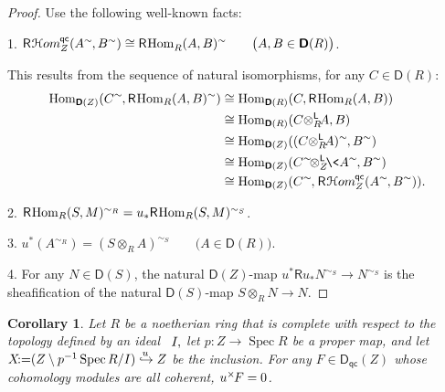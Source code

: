 \documentclass{compositio}
\theoremstyle{plain}
\newtheorem{subcor}[equation]{Corollary}
\theoremstyle{definition}
\theoremstyle{remark}
\numberwithin{equation}{thm}
\begin{document}
\begin{proof} Use the following well-known facts:{\vspace{2pt}}

1. ${{\mathsf R}{\mkern1mu}{{\mathcal H} om}_{{Z}}^{{\mkern-1mu}{\mathsf{qc}}}}(A^\sim{\mkern-1mu},B^\sim)\cong{\mathsf R}{\mkern-1mu}{\mkern-1mu}\operatorname{Hom}^{}_R(A,B)^\sim\qquad\big(A,B\in{\boldsymbol{\mathsf{D}}}(R)\big)$.{\vspace{2pt}}

\begin{small}
This results from the sequence of natural isomorphisms, for any $C\in{\boldsymbol{\mathsf{D}}}(R)$:
\begin{align*}
\operatorname{Hom}_{{\boldsymbol{\mathsf{D}}}(Z)}(C^\sim{\mkern-1mu},{\mathsf R}{\mkern-1mu}{\mkern-1mu}\operatorname{Hom}_R(A,B)^\sim)&\cong \operatorname{Hom}_{{\boldsymbol{\mathsf{D}}}(R)}(C,{\mathsf R}{\mkern-1mu}{\mkern-1mu}\operatorname{Hom}_R(A,B))\\
&\cong \operatorname{Hom}_{{\boldsymbol{\mathsf{D}}}(R)}(C{\otimes^{\mathsf L}_{{R}}}\!A,B)\\
&\cong \operatorname{Hom}_{{\boldsymbol{\mathsf{D}}}(Z)}((C{\otimes^{\mathsf L}_{{R}}}\!A)^\sim{\mkern-1mu},B^\sim)\\
&\cong \operatorname{Hom}_{{\boldsymbol{\mathsf{D}}}(Z)}(C^\sim\!{\otimes^{\mathsf L}_{{Z}}}\!\<A^\sim{\mkern-1mu},B^\sim)\\
&\cong \operatorname{Hom}_{{\boldsymbol{\mathsf{D}}}(Z)}(C^\sim{\mkern-1mu},{\mkern1mu}{{\mathsf R}{\mkern1mu}{{\mathcal H} om}_{{Z}}^{{\mkern-1mu}{\mathsf{qc}}}}(A^\sim{\mkern-1mu},B^\sim)).
\end{align*}
\end{small}
\vskip-8pt
2. ${\mathsf R}{\mkern-1mu}{\mkern-1mu}\operatorname{Hom}_R(S,M)^{\sim_R}= u_*{\mathsf R}{\mkern-1mu}{\mkern-1mu}\operatorname{Hom}_R(S,M)^{\sim_S}$.{\vspace{1pt}}

3. $u^*(A^{\sim_R})=(S\otimes_R A)^{\sim_S}\qquad\big(A\in{\boldsymbol{\mathsf{D}}}(R)\big).${\vspace{1pt}}

4. For any $N\in{\boldsymbol{\mathsf{D}}}(S)$, the natural ${\boldsymbol{\mathsf{D}}}(Z)$-map $u^*{\mathsf R} u_*N^{\sim_S}\to N^{\sim_S}$ is the sheafification of the natural ${\boldsymbol{\mathsf{D}}}(S)$-map $S\otimes_R N\to N$.
\end{proof}

\begin{subcor}\label{varGM}
 Let\/ $R$ be a  noetherian ring that is complete with respect to the topology defined by an ideal~ $I{\mkern-1mu},$ let\/ $p\colon Z\to \operatorname{Spec} R$ be a  proper map,
and let\/ $X{\!:=}(Z\setminus p^{-1}\operatorname{Spec} R/I)\overset {{\vbox to 0pt{\vskip-.5 ex\hbox{$\scriptstyle u{\mkern1mu}{\mkern1mu}{\mkern1mu}$}\vss}}}{\hookrightarrow} Z$ be the inclusion.{} 
For any\/ $F\in{{\boldsymbol{\mathsf{D}}}_{\mathsf{qc}}}(Z)$ whose cohomology modules are all coherent, $u^\times{\mkern-1mu}{\mkern-1mu} F=0$.
\end{subcor}
\end{document}
